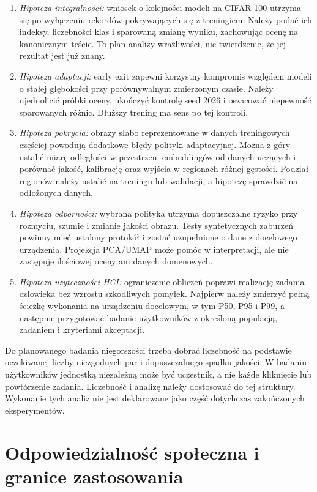 \documentclass[12pt,a4paper]{article}
\begin{document}
\begin{enumerate}
\item \emph{Hipoteza integralności:} wniosek o kolejności modeli na
CIFAR-100 utrzyma się po wyłączeniu rekordów pokrywających się z treningiem.
Należy podać ich indeksy, liczebności klas i sparowaną zmianę wyniku,
zachowując ocenę na kanonicznym teście. To plan analizy wrażliwości,
nie twierdzenie, że jej rezultat jest już znany.
\item \emph{Hipoteza adaptacji:} early exit zapewni korzystny kompromis
względem modeli o stałej głębokości przy porównywalnym zmierzonym czasie.
Należy ujednolicić próbki oceny, ukończyć kontrolę seed 2026 i oszacować
niepewność sparowanych różnic. Dłuższy trening ma sens po tej kontroli.
\item \emph{Hipoteza pokrycia:} obrazy słabo reprezentowane w danych
treningowych częściej powodują dodatkowe błędy polityki adaptacyjnej.
Można z góry ustalić miarę odległości w przestrzeni embeddingów od danych
uczących i porównać jakość, kalibrację oraz wyjścia w regionach różnej
gęstości. Podział regionów należy ustalić na treningu lub walidacji,
a hipotezę sprawdzić na odłożonych danych.
\item \emph{Hipoteza odporności:} wybrana polityka utrzyma dopuszczalne
ryzyko przy rozmyciu, szumie i zmianie jakości obrazu. Testy syntetycznych
zaburzeń powinny mieć ustalony protokół i zostać uzupełnione o dane
z docelowego urządzenia. Projekcja PCA/UMAP może pomóc w interpretacji,
ale nie zastępuje ilościowej oceny ani danych domenowych.
\item \emph{Hipoteza użyteczności HCI:} ograniczenie obliczeń poprawi
realizację zadania człowieka bez wzrostu szkodliwych pomyłek.
Najpierw należy zmierzyć pełną ścieżkę wykonania na urządzeniu docelowym,
w tym P50, P95 i P99, a następnie przygotować badanie użytkowników
z określoną populacją, zadaniem i kryteriami akceptacji.
\end{enumerate}

Do planowanego badania niegorszości trzeba dobrać liczebność na podstawie
oczekiwanej liczby niezgodnych par i dopuszczalnego spadku jakości.
W badaniu użytkowników jednostką niezależną może być uczestnik, a nie
każde kliknięcie lub powtórzenie zadania. Liczebność i analizę należy
dostosować do tej struktury. Wykonanie tych analiz nie jest deklarowane
jako część dotychczas zakończonych eksperymentów.

\section{Odpowiedzialność społeczna i granice zastosowania}
\end{document}
